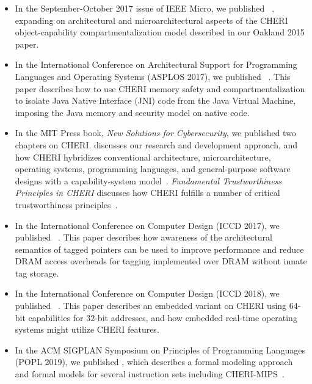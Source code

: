\begin{itemize}
\item In the September-October 2017 issue of IEEE Micro, we published
  ~\cite{watson2016:microjournal},
  expanding on architectural
  and microarchitectural aspects of the CHERI object-capability
  compartmentalization model described in our Oakland 2015 paper.

\item In the International Conference on Architectural Support for Programming
  Languages and Operating Systems (ASPLOS 2017), we published
  ~\cite{chisnall2017:cherijni}.
  This paper describes how to use CHERI memory safety and compartmentalization
  to isolate Java Native Interface (JNI) code from the Java Virtual Machine,
  imposing the Java memory and security model on native code.

\item In the MIT Press book, \textit{New Solutions for Cybersecurity}, we
  published two chapters on CHERI. 
  discusses our research and development approach, and how
  CHERI hybridizes conventional architecture, microarchitecture, operating
  systems, programming languages, and general-purpose software designs with
  a capability-system model~\cite{watson2017:cheri-deployability}.
  \textit{Fundamental Trustworthiness Principles in CHERI} discusses how CHERI
  fulfills a number of critical trustworthiness
  principles~\cite{neumann2017:cheri-principles}.

\item In the International Conference on Computer Design (ICCD 2017), we
  published ~\cite{joannou2017:tagged-memory}.
  This paper describes how awareness of the architectural semantics of tagged
  pointers can be used to improve performance and reduce DRAM access overheads
  for tagging implemented over DRAM without innate tag storage.

\item In the International Conference on Computer Design (ICCD 2018), we
  published ~\cite{xia:cherirtos}.
  This paper describes an embedded variant on CHERI using 64-bit capabilities
  for 32-bit addresses, and how embedded real-time operating systems might
  utilize CHERI features.

\item In the ACM SIGPLAN Symposium on Principles of Programming Languages
  (POPL 2019), we published , which describes
  a formal modeling approach and formal models
  for several instruction sets including CHERI-MIPS~\cite{sail-popl2019}.


\end{itemize}
